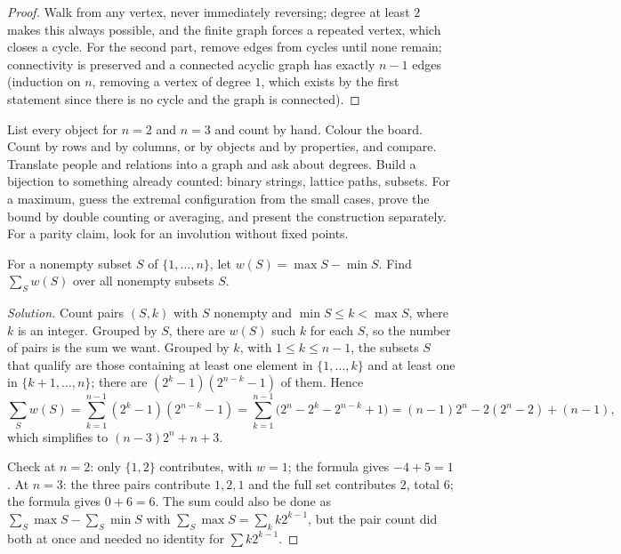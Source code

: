 \begin{proof}
Walk from any vertex, never immediately reversing; degree at least $2$ makes this always possible, and the finite graph forces a repeated vertex, which closes a cycle. For the second part, remove edges from cycles until none remain; connectivity is preserved and a connected acyclic graph has exactly $n-1$ edges (induction on $n$, removing a vertex of degree $1$, which exists by the first statement since there is no cycle and the graph is connected).
\end{proof}

\begin{firstmoves}
List every object for $n=2$ and $n=3$ and count by hand. Colour the board. Count by rows and by columns, or by objects and by properties, and compare. Translate people and relations into a graph and ask about degrees. Build a bijection to something already counted: binary strings, lattice paths, subsets. For a maximum, guess the extremal configuration from the small cases, prove the bound by double counting or averaging, and present the construction separately. For a parity claim, look for an involution without fixed points.
\end{firstmoves}

\begin{example}
For a nonempty subset $S$ of $\{1,\dots,n\}$, let $w(S)=\max S-\min S$. Find $\sum_S w(S)$ over all nonempty subsets $S$.
\end{example}

\begin{proof}[Solution]
Count pairs $(S,k)$ with $S$ nonempty and $\min S\le k<\max S$, where $k$ is an integer. Grouped by $S$, there are $w(S)$ such $k$ for each $S$, so the number of pairs is the sum we want. Grouped by $k$, with $1\le k\le n-1$, the subsets $S$ that qualify are those containing at least one element in $\{1,\dots,k\}$ and at least one in $\{k+1,\dots,n\}$; there are $(2^k-1)(2^{n-k}-1)$ of them. Hence
\[
\sum_S w(S)=\sum_{k=1}^{n-1}(2^k-1)(2^{n-k}-1)=\sum_{k=1}^{n-1}\bigl(2^n-2^k-2^{n-k}+1\bigr)=(n-1)2^n-2(2^n-2)+(n-1),
\]
which simplifies to $(n-3)2^n+n+3$.

Check at $n=2$: only $\{1,2\}$ contributes, with $w=1$; the formula gives $-4+5=1$. At $n=3$: the three pairs contribute $1,2,1$ and the full set contributes $2$, total $6$; the formula gives $0+6=6$. The sum could also be done as $\sum_S\max S-\sum_S\min S$ with $\sum_S\max S=\sum_kk2^{k-1}$, but the pair count did both at once and needed no identity for $\sum k2^{k-1}$.
\end{proof}

